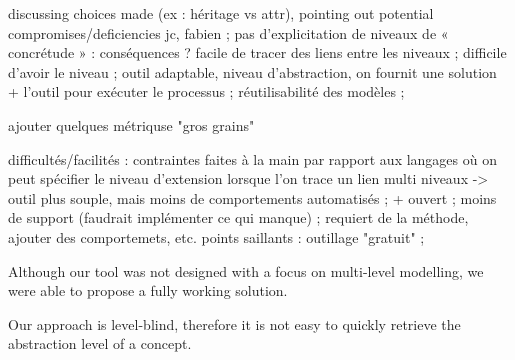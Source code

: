 discussing choices  made (ex : héritage vs attr), pointing out potential compromises/deficiencies
jc, fabien ; 
pas d'explicitation de niveaux de « concrétude » : conséquences ? facile de tracer des liens entre les niveaux ; difficile d'avoir le niveau ; 
outil adaptable, niveau d'abstraction, on fournit une solution + l'outil pour exécuter le processus ; réutilisabilité des modèles ; 

ajouter quelques métriquse "gros grains"

difficultés/facilités : contraintes faites à la main par rapport aux langages où on peut spécifier le niveau d'extension lorsque l'on trace un lien multi niveaux -> outil plus souple, mais moins de comportements automatisés ; + ouvert ; moins de support (faudrait implémenter ce qui manque) ; requiert de la méthode, ajouter des comportemets, etc.
points saillants :  outillage "gratuit" ; 



Although our tool was not designed with a focus on multi-level modelling, we were able to propose a fully working solution. 

Our approach is level-blind, therefore it is not easy to quickly retrieve the abstraction level of a concept.
